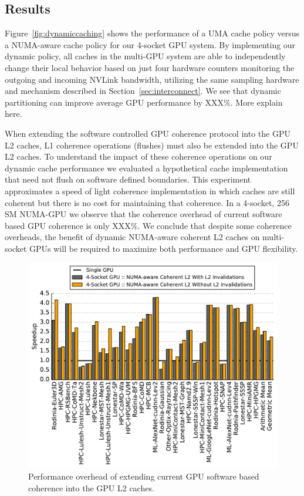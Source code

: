 \subsection{Results}

Figure~\ref{fig:dynamiccaching} shows the performance of a UMA cache policy versus
a NUMA-aware cache policy for our 4-socket GPU system.  By implementing our dynamic
policy, all caches in the multi-GPU system are able to independently change their local
behavior based on just four hardware counters monitoring the outgoing and incoming
NVLink bandwidth, utilizing the same sampling hardware and mechanism described in 
Section~\ref{sec:interconnect}.  We see that dynamic partitioning can improve average GPU
performance by XXX\%.  More explain here.

When extending the software controlled GPU coherence protocol into the GPU L2 caches,
L1 coherence operations (flushes) must also be extended into the GPU L2 caches.  To understand
the impact of these coherence operations on our dynamic cache performance we evaluated a hypothetical
cache implementation that need not flush on software defined boundaries.  This experiment
approximates a speed of light coherence implementation in which caches are still coherent but
there is no cost for maintaining that coherence.  In a 4-socket, 256 SM NUMA-GPU we observe
that the coherence overhead of current software based GPU coherence is only XXX\%.  We conclude
that despite some coherence overheads, the benefit of dynamic NUMA-aware coherent L2 caches
on multi-socket GPUs will be required to maximize both performance and GPU flexibility.

\begin{figure}[t]
    \centering
    \includegraphics[width=1.0\columnwidth]{figures/plot_no_inval_WB.pdf}
    \caption{Performance overhead of extending current GPU software based coherence
    into the GPU L2 caches.}
    \label{fig:invalidations}
\end{figure}
